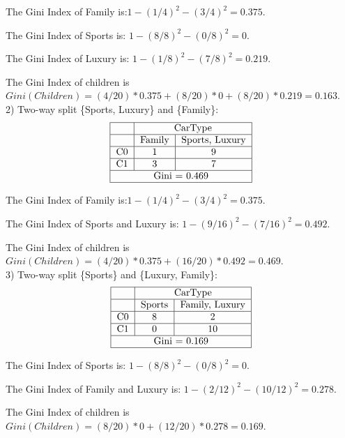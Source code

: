 \documentclass[22pt]{article}
\begin{document}
		The Gini Index of Family is:$1 - (1/4)^2 - (3/4)^2=0.375$.

		The Gini Index of Sports is: $1 - (8/8)^2 - (0/8)^2=0$.

		The Gini Index of Luxury is: $1 - (1/8)^2 - (7/8)^2=0.219$.

		The Gini Index of children is $Gini(Children) = (4/20)*0.375+(8/20)*0+(8/20)*0.219 = 0.163$. \\[1ex]

		2) Two-way split \{Sports, Luxury\} and \{Family\}: 
		\begin{equation}
		\begin{tabular}{|c|c|c|}
			\hline
			&\multicolumn{2}{c|}{CarType}\\
			\hline
			& Family & {Sports, Luxury}\\ \hline
			 C0&1&9\\ 
			 \hline
			 C1&3&7\\  
			 \hline 
			 \multicolumn{3}{|c|}{Gini = 0.469}\\
			 \hline
		\end{tabular}
		\end{equation}

		The Gini Index of Family is:$1 - (1/4)^2 - (3/4)^2=0.375$.

		The Gini Index of Sports and Luxury is: $1 - (9/16)^2 - (7/16)^2 = 0.492$. 

		The Gini Index of children is $Gini(Children) = (4/20)*0.375+(16/20)*0.492=0.469$. \\[1ex]

		3) Two-way split \{Sports\} and \{Luxury, Family\}:
		\begin{equation}
		\begin{tabular}{|c|c|c|}
			\hline
			&\multicolumn{2}{c|}{CarType}\\
			\hline
			& Sports & {Family, Luxury}\\ \hline
			 C0&8&2\\ 
			 \hline
			 C1&0&10\\  
			 \hline 
			 \multicolumn{3}{|c|}{Gini = 0.169}\\
			 \hline
		\end{tabular}
		\end{equation}

		The Gini Index of Sports is: $1 - (8/8)^2 - (0/8)^2=0$.

		The Gini Index of Family and Luxury is: $1-(2/12)^2-(10/12)^2 = 0.278$.

		The Gini Index of children is $Gini(Children) =(8/20)*0+(12/20)*0.278 = 0.169$. \\[1ex]
\end{document}
